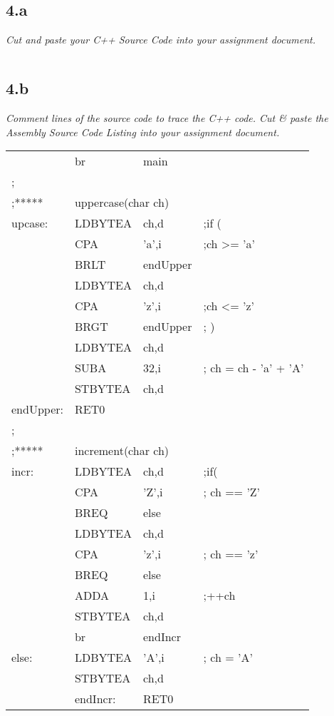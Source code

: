 \documentclass[a4paper,man,natbib]{apa6}
\begin{document}
\subsection{4.a}
\emph{Cut and paste your C++ Source Code into your assignment document.} \\
\inputminted{c++}{./SourceCode/ToUpperAndIncrement.cpp}
\clearpage
\subsection{4.b}
\emph{Comment lines of the source code to trace the C++ code. Cut \& paste the Assembly Source Code Listing into your assignment document.} \\
	\begin{tabular}{l l l l}
        &br     &main & \\
; &&& \\
;*****  &\multicolumn{2}{l}{uppercase(char ch)}& \\
upcase: &LDBYTEA &ch,d      & ;if ( \\
	&CPA     &'a',i      &;ch >= 'a' \\
	&BRLT   	&endUpper &\\
	&LDBYTEA &ch,d   &\\
	&CPA     &'z',i      &;ch <= 'z' \\
	&BRGT    &endUpper   &; )\\
	&LDBYTEA &ch,d	&\\
	&SUBA    &32,i       &; ch = ch - 'a' + 'A' \\
	&STBYTEA &ch,d &\\
endUpper:&RET0 && \\
; &&&\\
;*****  &\multicolumn{2}{l}{increment(char ch)}& \\
incr:&LDBYTEA&ch,d       &;if( \\
	&CPA     &'Z',i       &; ch == 'Z' \\
	&BREQ    &else	&\\
	&LDBYTEA &ch,d	&\\
	&CPA     &'z',i       &; ch == 'z' \\
	&BREQ    &else	&\\
	&ADDA    &1,i         &;++ch \\
	&STBYTEA &ch,d	&\\
	&br      &endIncr	&\\
else:&LDBYTEA&'A',i      &; ch = 'A' \\
	&STBYTEA &ch,d	&\\
	&endIncr:&RET0	&\\

\end{tabular}
\end{document}
